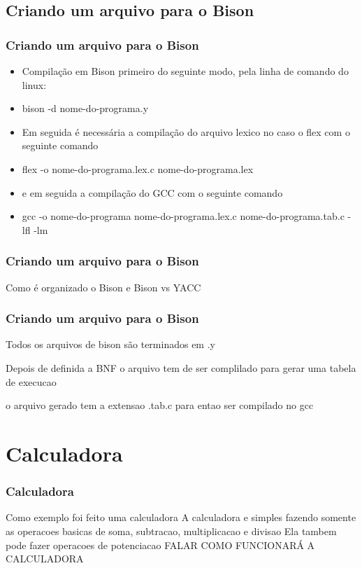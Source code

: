 \documentclass{beamer}
\begin{document}
\subsection{Criando um arquivo para o Bison}

\begin{frame}
\frametitle{Criando um arquivo para o Bison}
	\begin{itemize} 				%
	    \item<1->   Compilação em Bison primeiro do seguinte modo, pela linha de comando do linux:	%
	    \item<2-> bison -d nome-do-programa.y
	    \item<3-> Em seguida é necessária a compilação do arquivo lexico no caso o flex com o seguinte comando\:
	    \item<4-> flex -o nome-do-programa.lex.c nome-do-programa.lex
	    \item<5-> e em seguida a compilação do GCC com o seguinte comando 
	    \item<6-> gcc -o nome-do-programa nome-do-programa.lex.c nome-do-programa.tab.c -lfl -lm
    \end{itemize}
	

\end{frame}

\begin{frame}
\frametitle{Criando um arquivo para o Bison}
		Como é organizado o Bison e Bison vs YACC
	
\end{frame}

\begin{frame}
\frametitle{Criando um arquivo para o Bison}
	Todos os arquivos de bison são terminados em .y
	\item<1-> Depois de definida a BNF o arquivo tem de ser complilado para gerar uma tabela de execucao
	\item<2-> o arquivo gerado tem a extensao .tab.c para entao ser compilado no gcc
	
\end{frame}
\section{Calculadora}
\begin{frame}
\frametitle{Calculadora}
	Como exemplo foi feito uma calculadora
	A calculadora e simples fazendo somente as operacoes basicas de soma, subtracao, multiplicacao e divisao
	Ela tambem pode fazer operacoes de potenciacao
FALAR COMO FUNCIONARÁ A CALCULADORA
\end{frame}
\end{document}
